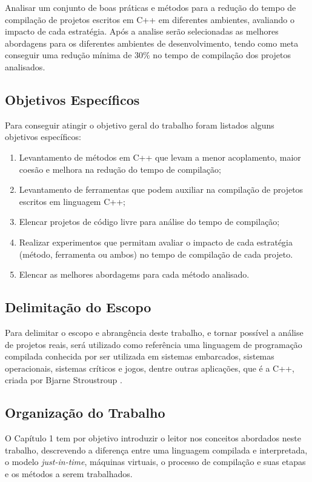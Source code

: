 Analisar um conjunto de boas práticas e métodos para a redução do
 tempo de compilação de projetos escritos em C++ em diferentes ambientes,
 avaliando o impacto de cada estratégia.
 Após a analise serão selecionadas as melhores abordagens
 para os diferentes ambientes de desenvolvimento, tendo como meta conseguir uma
 redução mínima de 30\% no tempo de compilação dos projetos analisados. 

\subsection*{Objetivos Específicos}

Para conseguir atingir o objetivo geral do trabalho foram listados
 alguns objetivos específicos:

\begin{enumerate}
    \item Levantamento de métodos em C++ que levam a menor acoplamento,
 maior coesão e melhora na redução do tempo de compilação;
    \item Levantamento de ferramentas que podem auxiliar na compilação
 de projetos escritos em linguagem C++;
    \item Elencar projetos de código livre para análise do tempo de
 compilação;
    \item Realizar experimentos que permitam avaliar o impacto de cada
 estratégia (método, ferramenta ou ambos) no tempo de compilação de
 cada projeto.
    \item Elencar as melhores abordagems para cada método analisado.
\end{enumerate}


\subsection*{Delimitação do Escopo}

Para delimitar o escopo e abrangência deste trabalho, e tornar possível
 a análise de projetos reais, será utilizado como referência uma linguagem
 de programação compilada conhecida por ser utilizada em sistemas embarcados,
 sistemas operacionais, sistemas críticos e jogos, dentre outras aplicações,
 que é a C++, criada por Bjarne Stroustroup \cite{BjarneC++}.

\subsection*{Organização do Trabalho}

O Capítulo 1 tem por objetivo introduzir o leitor nos conceitos abordados
 neste trabalho, descrevendo a diferença entre uma linguagem compilada e
 interpretada, o modelo \textit{just-in-time}, máquinas virtuais, o processo de compilação
 e suas etapas e os métodos a serem trabalhados.

